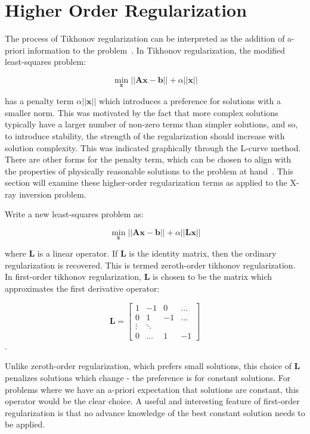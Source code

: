 \section{Higher Order Regularization}

The process of Tikhonov regularization can be interpreted as the addition of a-priori information to the problem~\cite{Tikhonov1995NumericalMF}. In Tikhonov regularization, the modified least-squares problem:

$$\min_{\mathbf{x}} \vert \vert \mathbf{A} \mathbf{x} - \mathbf{b} \vert \vert + \alpha \vert \vert \mathbf{x} \vert \vert$$

has a penalty term  $\alpha \vert \vert \mathbf{x} \vert \vert$ which introduces a preference for solutions with a smaller norm. This was motivated by the fact that more complex solutions typically have a larger number of non-zero terms than simpler solutions, and so, to introduce stability, the strength of the regularization should increase with solution complexity. This was indicated graphically through the L-curve method. There are other forms for the penalty term, which can be chosen to align with the properties of physically reasonable solutions to the problem at hand~\citep{Aster2005}. This section will examine these higher-order regularization terms as applied to the X-ray inversion problem. 

Write a new least-squares problem as:

$$\min_{\mathbf{x}} \vert \vert \mathbf{A} \mathbf{x} - \mathbf{b} \vert \vert + \alpha \vert \vert \mathbf{L} \mathbf{x} \vert \vert$$

where $\mathbf{L}$ is a linear operator. If $\mathbf{L}$ is the identity matrix, then the ordinary regularization is recovered. This is termed zeroth-order tikhonov regularization. In first-order tikhonov regularization, $\mathbf{L}$ is chosen to be the matrix which approximates the first derivative operator:

\[
\mathbf{L} = \begin{bmatrix} 
    1 & -1 & 0 & \dots \\
    0 & 1 & -1 &\dots \\
    \vdots & \ddots & \\
    0 & \dots & 1 & -1 
    \end{bmatrix}
\].

Unlike zeroth-order regularization, which prefers small solutions, this choice of $\mathbf{L}$ penalizes solutions which change - the preference is for constant solutions. For problems where we have an a-priori expectation that solutions are constant, this operator would be the clear choice. A useful and interesting feature of first-order regularization is that no advance knowledge of the best constant solution needs to be applied. 

